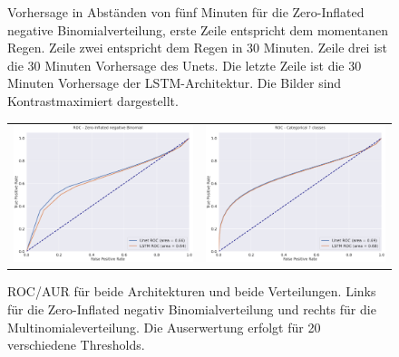 \begin{figure}[h]
\begin{tabular}{lllllll}
\end{tabular}
\caption{Vorhersage in Abständen von fünf Minuten für die Zero-Inflated negative Binomialverteilung, erste Zeile entspricht dem momentanen Regen. Zeile zwei entspricht dem Regen in 30 Minuten. Zeile drei ist die 30 Minuten Vorhersage des Unets. Die letzte Zeile ist die 30 Minuten Vorhersage der LSTM-Architektur. Die Bilder sind Kontrastmaximiert dargestellt. \label{fig:anomerz}}
\end{figure}



\begin{figure}[h]
\begin{tabular}{cc}
\includegraphics[width=70mm]{abb/ROC_ZINFBINOM.png}&
\includegraphics[width=70mm]{abb/ROC_Categorical.png}
\end{tabular}
\caption{ROC/AUR für beide Architekturen und beide Verteilungen. Links für die Zero-Inflated negativ Binomialverteilung und rechts für die Multinomialeverteilung.
Die Auserwertung erfolgt für 20 verschiedene Thresholds. \label{fig:anomerz}}
\end{figure}





\newpage
